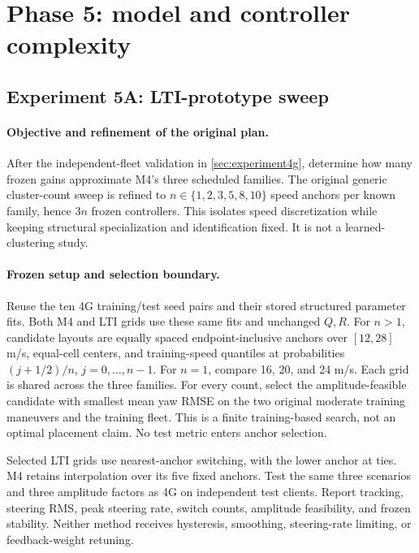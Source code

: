 \section{Phase 5: model and controller complexity}
\label{sec:phase5}

\subsection{Experiment 5A: LTI-prototype sweep}
\label{sec:experiment5a}
\paragraph{Objective and refinement of the original plan.}
After the independent-fleet validation in \cref{sec:experiment4g}, determine
how many frozen gains approximate M4's three scheduled families. The original
generic cluster-count sweep is refined to $n\in\{1,2,3,5,8,10\}$ speed anchors
per known family, hence $3n$ frozen controllers. This isolates speed
discretization while keeping structural specialization and identification fixed.
It is not a learned-clustering study.

\paragraph{Frozen setup and selection boundary.}
Reuse the ten 4G training/test seed pairs and their stored structured parameter
fits. Both M4 and LTI grids use these same fits and unchanged $Q,R$. For $n>1$,
candidate layouts are equally spaced endpoint-inclusive anchors over $[12,28]$
m/s, equal-cell centers, and training-speed quantiles at probabilities
$(j+1/2)/n$, $j=0,\ldots,n-1$. For $n=1$, compare 16, 20, and 24 m/s.
Each grid is shared across the three families. For every count, select the
amplitude-feasible candidate with smallest mean yaw RMSE on the two original
moderate training maneuvers and the training fleet. This is a finite
training-based search, not an optimal placement claim. No test metric enters
anchor selection.

Selected LTI grids use nearest-anchor switching, with the lower anchor at ties.
M4 retains interpolation over its five fixed anchors. Test the same three
scenarios and three amplitude factors as 4G on independent test clients.
Report tracking, steering RMS, peak steering rate, switch counts, amplitude
feasibility, and frozen stability. Neither method receives hysteresis,
smoothing, steering-rate limiting, or feedback-weight retuning.

